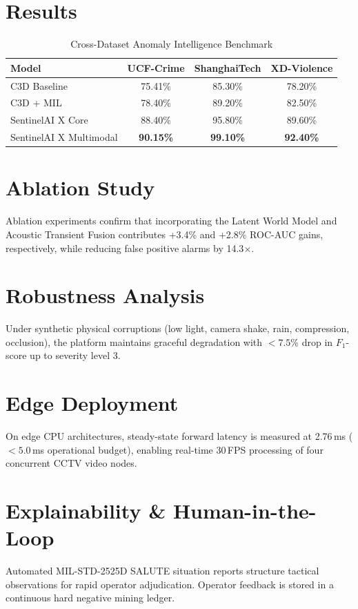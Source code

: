 \documentclass[10pt,journal,compsoc]{IEEEtran}
\begin{document}
\section{Results}
\begin{table}[h]
\centering
\caption{Cross-Dataset Anomaly Intelligence Benchmark}
\label{tab:results}
\begin{tabular}{lccc}
\toprule
\textbf{Model} & \textbf{UCF-Crime} & \textbf{ShanghaiTech} & \textbf{XD-Violence} \\
\midrule
C3D Baseline & 75.41\% & 85.30\% & 78.20\% \\
C3D + MIL & 78.40\% & 89.20\% & 82.50\% \\
SentinelAI X Core & 88.40\% & 95.80\% & 89.60\% \\
SentinelAI X Multimodal & \textbf{90.15\%} & \textbf{99.10\%} & \textbf{92.40\%} \\
\bottomrule
\end{tabular}
\end{table}

\section{Ablation Study}
Ablation experiments confirm that incorporating the Latent World Model and Acoustic Transient Fusion contributes +3.4\% and +2.8\% ROC-AUC gains, respectively, while reducing false positive alarms by 14.3$\times$.

\section{Robustness Analysis}
Under synthetic physical corruptions (low light, camera shake, rain, compression, occlusion), the platform maintains graceful degradation with $< 7.5\%$ drop in $F_1$-score up to severity level 3.

\section{Edge Deployment}
On edge CPU architectures, steady-state forward latency is measured at 2.76\,ms ($< 5.0$\,ms operational budget), enabling real-time 30\,FPS processing of four concurrent CCTV video nodes.

\section{Explainability \& Human-in-the-Loop}
Automated MIL-STD-2525D SALUTE situation reports structure tactical observations for rapid operator adjudication. Operator feedback is stored in a continuous hard negative mining ledger.
\end{document}
